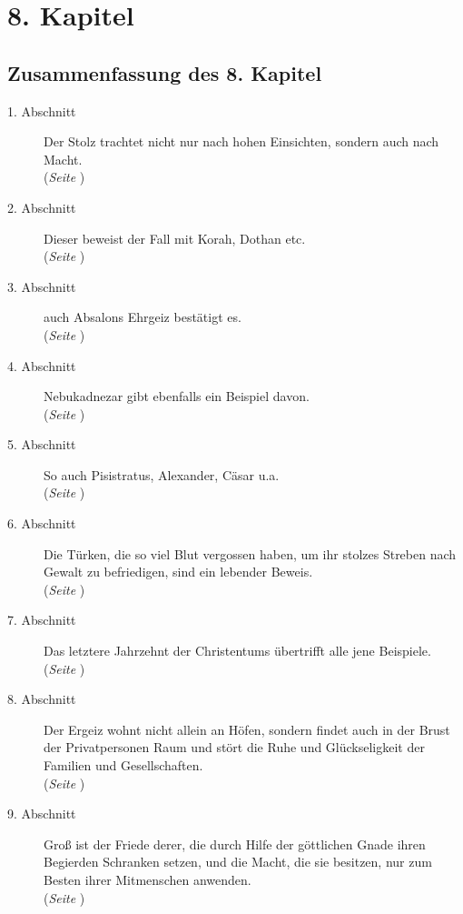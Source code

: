 
\chapter{8. Kapitel} \label{kap8}

\section{Zusammenfassung des 8. Kapitel}


\begin{description}
\item[1. Abschnitt] Der Stolz trachtet nicht nur nach hohen Einsichten, sondern
auch nach Macht.
\\(\textit{Seite \pageref{kap8_ab1}})
\item[2. Abschnitt] Dieser beweist der Fall mit Korah, Dothan etc.
\\(\textit{Seite \pageref{kap8_ab2}})
\item[3. Abschnitt] auch Absalons Ehrgeiz bestätigt es.
\\(\textit{Seite \pageref{kap8_ab3}})
\item[4. Abschnitt] Nebukadnezar gibt ebenfalls ein Beispiel davon.
\\(\textit{Seite \pageref{kap8_ab4}})
\item[5. Abschnitt] So auch Pisistratus, Alexander, Cäsar u.a.
\\(\textit{Seite \pageref{kap8_ab5}})
\item[6. Abschnitt] Die Türken, die so viel Blut vergossen haben, um ihr stolzes
Streben nach Gewalt zu befriedigen, sind ein lebender Beweis.
\\(\textit{Seite \pageref{kap8_ab6}})
\item[7. Abschnitt] Das letztere Jahrzehnt der Christentums übertrifft alle
jene Beispiele.
\\(\textit{Seite \pageref{kap8_ab7}})
\item[8. Abschnitt] Der Ergeiz wohnt nicht allein an Höfen, sondern findet auch
in der Brust der Privatpersonen Raum und stört die Ruhe und Glückseligkeit der
Familien und Gesellschaften.
\\(\textit{Seite \pageref{kap8_ab8}})
\item[9. Abschnitt] Groß ist der Friede derer, die durch Hilfe der göttlichen
Gnade ihren Begierden Schranken setzen, und die Macht, die sie besitzen, nur zum
Besten ihrer Mitmenschen anwenden.
\\(\textit{Seite \pageref{kap8_ab9}})

\end{description}

